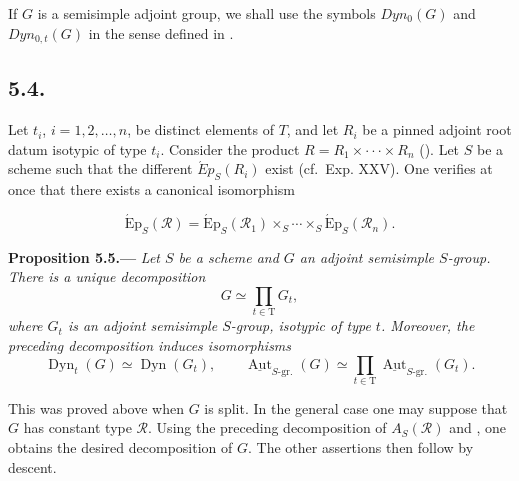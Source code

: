 If \(G\) is a semisimple adjoint group, we shall use the symbols \(Dyn_{0}(G)\) and \(Dyn_{0, t}(G)\) in the sense defined in
.

\subsection*{5.4.}

Let \(t_i\), \(i=1,2,\ldots,n\), be distinct elements of \(T\), and let \(R_i\) be a pinned adjoint root datum isotypic of
type \(t_{i}\). Consider the product \(R = R_{1} \times \cdot\cdot\cdot \times R_{n}\) (). Let \(S\) be a
scheme such that the different \(\acute{E}p_{S}(R_{i})\) exist (cf.~Exp. XXV). One verifies at once that there exists a
canonical isomorphism

\[
  \tag{*}\label{sga3:xxiv:subsection:5-4:equation:star}
  \operatorname{\acute{E}p}_S(\mathscr R)
  =
  \operatorname{\acute{E}p}_S(\mathscr R_1)
  \times_S\cdots\times_S
  \operatorname{\acute{E}p}_S(\mathscr R_n).
\]





\par\medskip\noindent{}\textbf{Proposition 5.5.---}\enspace
\emph{Let \(S\) be a scheme and \(G\) an adjoint semisimple
\(S\)-group.  There is a unique decomposition}
\[
  G\simeq\prod_{t\in\mathrm T}G_t,
\]
\emph{where \(G_t\) is an adjoint semisimple \(S\)-group, isotypic of
type \(t\).  Moreover, the preceding decomposition induces
isomorphisms}
\[
  \operatorname{Dyn}_t(G)\simeq\operatorname{Dyn}(G_t),
  \qquad
  \underline{\operatorname{Aut}}_{S\text{-}\mathrm{gr.}}(G)
  \simeq
  \prod_{t\in\mathrm T}
  \underline{\operatorname{Aut}}_{S\text{-}\mathrm{gr.}}(G_t).
\]

This was proved above when \(G\) is split.  In the general case one may
suppose that \(G\) has constant type \(\mathscr R\).  Using the
preceding decomposition of \(A_S(\mathscr R)\) and , one obtains
the desired decomposition of \(G\).  The other assertions then follow
by descent.

